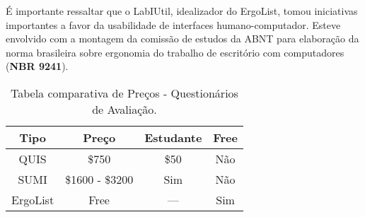 		É importante ressaltar que o LabIUtil, idealizador do ErgoList, tomou iniciativas importantes a favor da usabilidade de interfaces humano-computador. Esteve envolvido com a montagem da comissão de estudos da ABNT para elaboração da norma brasileira sobre ergonomia do trabalho de escritório com computadores (\textbf{NBR 9241}).

		\newpage

		\label{subsubsec:questionarios_tables}
		\begin{table}[h]
			\centering 
			\begin{tabular}{|c|c|c|c|}

				\hline

				Tipo & Preço & Estudante\footnotemark[1] & Free \\
				
				\hline
				
				QUIS & \$750 & \$50 & Não \\
				
				SUMI & \$1600 - \$3200 & Sim & Não \\
				
				ErgoList & Free & --- & Sim  \\

				\hline

			\end{tabular}
			\caption[Tabela comparativa de Preços - Questionários de Avaliação]{Tabela comparativa de Preços - Questionários de Avaliação.}
			\label{tab:questionarios._tabl}
		\end{table}




		

		

